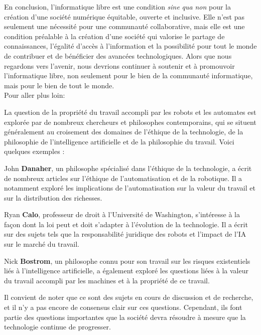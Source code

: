En conclusion, l'informatique libre est une condition \textit{sine} \textit{qua} \textit{non} pour la création d'une société numérique équitable, ouverte et inclusive. Elle n'est pas seulement une nécessité pour une communauté collaborative, mais elle est une condition préalable à la création d'une société qui valorise le partage de connaissances, l'égalité d'accès à l'information et la possibilité pour tout le monde de contribuer et de bénéficier des avancées technologiques. Alors que nous regardons vers l'avenir, nous devrions continuer à soutenir et à promouvoir l'informatique libre, non seulement pour le bien de la communauté informatique, mais pour le bien de tout le monde.\\


Pour aller plus loin:

La question de la propriété du travail accompli par les robots et les automates est explorée par de nombreux chercheurs et philosophes contemporains, qui se situent généralement au croisement des domaines de l'éthique de la technologie, de la philosophie de l'intelligence artificielle et de la philosophie du travail. Voici quelques exemples :

John \textbf{Danaher}, un philosophe spécialisé dans l'éthique de la technologie, a écrit de nombreux articles sur l'éthique de l'automatisation et de la robotique. Il a notamment exploré les implications de l'automatisation sur la valeur du travail et sur la distribution des richesses.\cite{Maclaurin2021-MACACG}

Ryan \textbf{Calo}, professeur de droit à l'Université de Washington, s'intéresse à la façon dont la loi peut et doit s'adapter à l'évolution de la technologie. Il a écrit sur des sujets tels que la responsabilité juridique des robots et l'impact de l'IA sur le marché du travail.\cite{9539878}

Nick \textbf{Bostrom}, un philosophe connu pour son travail sur les risques existentiels liés à l'intelligence artificielle, a également exploré les questions liées à la valeur du travail accompli par les machines et à la propriété de ce travail.\cite{bostrom2014superintelligence}

Il convient de noter que ce sont des sujets en cours de discussion et de recherche, et il n'y a pas encore de consensus clair sur ces questions. Cependant, ils font partie des questions importantes que la société devra résoudre à mesure que la technologie continue de progresser.\\


